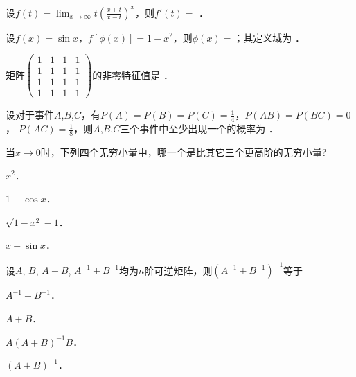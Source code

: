 \documentclass[plain,noanswer,medmath]{../../template/jnuexam}
\begin{document}






\begin{problem}
设$f(t) = \lim_{x \to \infty} t\left(\frac{x + t}{x - t} \right)^x$，则$f'(t) =$ \fillin{}．
\end{problem}




\begin{problem}
设$f(x) = \sin x$，$f[\phi(x)] = 1 - x^2$，则$\phi (x) =$\fillin{}；其定义域为 \fillin{}．
\end{problem}


\begin{problem}
矩阵$\begin{pmatrix}
  1 & 1 & 1 & 1 \\
  1 & 1 & 1 & 1 \\
  1 & 1 & 1 & 1 \\
  1 & 1 & 1 & 1
\end{pmatrix}$的非零特征值是 \fillin{}．
\end{problem}


\begin{problem}
设对于事件$A$,$B$,$C$，有$P(A) = P(B) = P(C) = \frac{1}{4}$，$P(AB) = P(BC) = 0$，
$P(AC) = \frac{1}{8}$，则$A$,$B$,$C$三个事件中至少出现一个的概率为 \fillin{}．
\end{problem}






\begin{problem}
当$x \to 0$时，下列四个无穷小量中，哪一个是比其它三个更高阶的无穷小量? \pickout{}
\begin{abcd}
\item $x^2$．     
\item $1 - \cos x$．     
\item $\sqrt{1 - x^2} - 1$．     
\item $x - \sin x$．
\end{abcd}
\end{problem}


\begin{problem}
设$A$, $B$, $A + B$, $A^{-1} + B^{-1}$均为$n$阶可逆矩阵，则$(A^{-1} + B^{-1})^{-1}$等于\pickout{}
\begin{abcd}
\item $A^{-1} + B^{-1}$．
\item $A + B$．
\item $A(A + B)^{-1} B$．
\item $(A + B)^{-1}$．
\end{abcd}
\end{problem}
\end{document}
